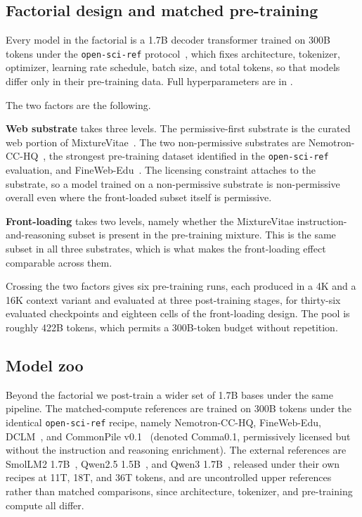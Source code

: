 \documentclass{article}
\begin{document}
\subsection{Factorial design and matched pre-training}
\label{sec:methods-factorial}

Every model in the factorial is a 1.7B decoder transformer trained on 300B tokens under the \texttt{open-sci-ref} protocol~\citep{nezhurina2025opensciref}, which fixes architecture, tokenizer, optimizer, learning rate schedule, batch size, and total tokens, so that models differ only in their pre-training data. Full hyperparameters are in .

The two factors are the following.

\textbf{Web substrate} takes three levels. The permissive-first substrate is the curated web portion of MixtureVitae~\citep{nguyen2025mixturevitae_arxiv}. The two non-permissive substrates are Nemotron-CC-HQ~\citep{su2025nemotroncctransformingcommoncrawl}, the strongest pre-training dataset identified in the \texttt{open-sci-ref} evaluation, and FineWeb-Edu~\citep{penedo2024fineweb}. The licensing constraint attaches to the substrate, so a model trained on a non-permissive substrate is non-permissive overall even where the front-loaded subset itself is permissive.

\textbf{Front-loading} takes two levels, namely whether the MixtureVitae instruction-and-reasoning subset is present in the pre-training mixture. This is the same subset in all three substrates, which is what makes the front-loading effect comparable across them.

Crossing the two factors gives six pre-training runs, each produced in a 4K and a 16K context variant and evaluated at three post-training stages, for thirty-six evaluated checkpoints and eighteen cells of the front-loading design. The pool is roughly 422B tokens, which permits a 300B-token budget without repetition.

\subsection{Model zoo}
\label{sec:methods-models}

Beyond the factorial we post-train a wider set of 1.7B bases under the same pipeline. The matched-compute references are trained on 300B tokens under the identical \texttt{open-sci-ref} recipe, namely Nemotron-CC-HQ, FineWeb-Edu, DCLM~\citep{li2024datacomplm}, and CommonPile v0.1~\citep{kandpal2025commonpilev018tb_arxiv} (denoted Comma0.1, permissively licensed but without the instruction and reasoning enrichment). The external references are SmolLM2 1.7B~\citep{allal2025smollm2}, Qwen2.5 1.5B~\citep{qwen25tr}, and Qwen3 1.7B~\citep{qwen3tr}, released under their own recipes at 11T, 18T, and 36T tokens, and are uncontrolled upper references rather than matched comparisons, since architecture, tokenizer, and pre-training compute all differ.
\end{document}
